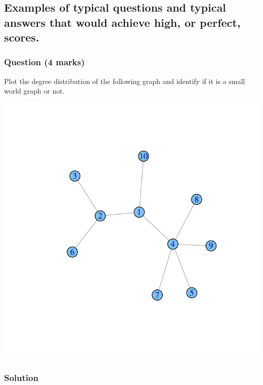 \documentclass[a4paper,oneside]{book}
\begin{document}
\subsection*{Examples of typical questions and typical answers that
  would achieve high, or perfect, scores.}






\subsubsection*{Question (4 marks)}

Plot the degree distribution of the following graph and identify if it
is a small world graph or not.

\vspace{-6em}
\begin{center}
\includegraphics{bnetwork}
\end{center}

\subsubsection*{Solution}
\end{document}

